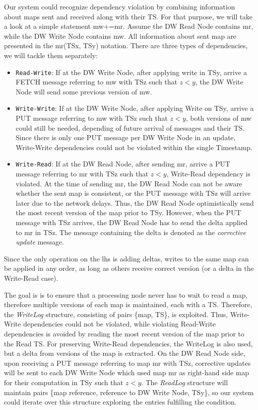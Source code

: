 \documentclass{sig-semester}
\begin{document}
Our system could recognize dependency violation by combining information about maps sent and received along with their TS. For that purpose, we will take a look at a simple statement mw+=mr. Assume the DW Read Node contains mr, while the DW Write Node contains mw. All information about sent map are presented in the mr(TSx, TSy) notation. There are three types of dependencies, we will tackle them separately:

\begin{itemize} 
 \item \texttt{Read-Write}:  If at the DW Write Node, after applying write in TSy, arrive a FETCH message referring to mw with TSz such that $z<y$, the DW Write Node will send some previous version of mw.

 \item \texttt{Write-Write}: If at the DW Write Node, after applying Write on TSy, arrive a PUT message referring to mw with TSz such that $z<y$, both versions of mw could still be needed, depending of future arrival of messages and their TS. Since there is only one PUT message per DW Write Node in an update, Write-Write dependencies could not be violated within the single Timestamp.
 
 \item \texttt{Write-Read}:  If at the DW Read Node, after sending mr, arrive a PUT message referring to mr with TSz such that $z<y$, Write-Read dependency is violated. At the time of sending mr, the DW Read Node can not be aware whether the sent map is consistent, or the PUT message with TSz will arrive later due to the network delays. Thus, the DW Read Node optimistically send the most recent version of the map prior to TSy. However, when the PUT message with TSz arrives, the DW Read Node has to send the delta applied to mr in TSz. The message containing the delta is denoted as the \textit{corrective update} message.

\end{itemize}

Since the only operation on the lhs is adding deltas, writes to the same map can be applied in any order, as long as others receive correct version (or a delta in the Write-Read case).

The goal is is to ensure that a processing node never has to wait to read a map, therefore multiple versions of each map is maintained, each with a TS. Therefore, the \textit{WriteLog} structure, consisting of pairs \{map, TS\}, is exploited. Thus, Write-Write dependencies could not be violated, while violating Read-Write dependencies is avoided by reading the most recent version of the map prior to the Read TS. For preserving Write-Read dependencies, the WriteLog is also used, but a delta from versions of the map is extracted. On the DW Read Node side, upon receiving a PUT message referring to map mr with TSz, corrective updates will be sent to each DW Write Node which used map mr as right-hand side map for their computation in TSy such that $z<y$. The \textit{ReadLog} structure will maintain pairs \{map reference, reference to DW Write Node, TSy\}, so our system could iterate over this structure exploring the entries fulfilling the condition.
\end{document}
